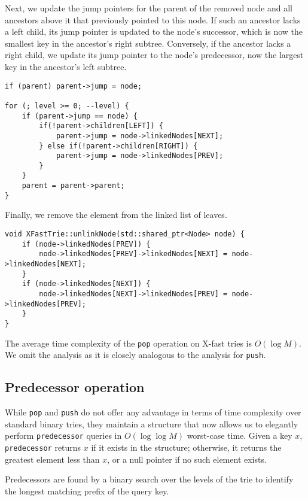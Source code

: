 Next, we update the jump pointers for the parent of the removed node and all ancestors above it that previously pointed to this node. If such an ancestor lacks a left child, its jump pointer is updated to the node’s successor, which is now the smallest key in the ancestor’s right subtree. Conversely, if the ancestor lacks a right child, we update its jump pointer to the node’s predecessor, now the largest key in the ancestor’s left subtree.

\begin{verbatim}
if (parent) parent->jump = node;

for (; level >= 0; --level) {
    if (parent->jump == node) {
        if(!parent->children[LEFT]) {
            parent->jump = node->linkedNodes[NEXT];
        } else if(!parent->children[RIGHT]) {
            parent->jump = node->linkedNodes[PREV];
        }
    }
    parent = parent->parent;
}
\end{verbatim}

Finally, we remove the element from the linked list of leaves.

\begin{verbatim}
void XFastTrie::unlinkNode(std::shared_ptr<Node> node) {
    if (node->linkedNodes[PREV]) {
        node->linkedNodes[PREV]->linkedNodes[NEXT] = node->linkedNodes[NEXT];
    }
    if (node->linkedNodes[NEXT]) {
        node->linkedNodes[NEXT]->linkedNodes[PREV] = node->linkedNodes[PREV];
    }
}
\end{verbatim}

The average time complexity of the \texttt{pop} operation on X-fast tries is \( O(\log M) \). We omit the analysis as it is closely analogous to the analysis for \texttt{push}.

\subsection{Predecessor operation}

While \texttt{pop} and \texttt{push} do not offer any advantage in terms of time complexity over standard binary tries, they maintain a structure that now allows us to elegantly perform \texttt{predecessor} queries in \( O(\log \log M) \) worst-case time. Given a key \(x\), \texttt{predecessor} returns \(x\) if it exists in the structure; otherwise, it returns the greatest element less than \(x\), or a null pointer if no such element exists.

Predecessors are found by a binary search over the levels of the trie to identify the longest matching prefix of the query key.

